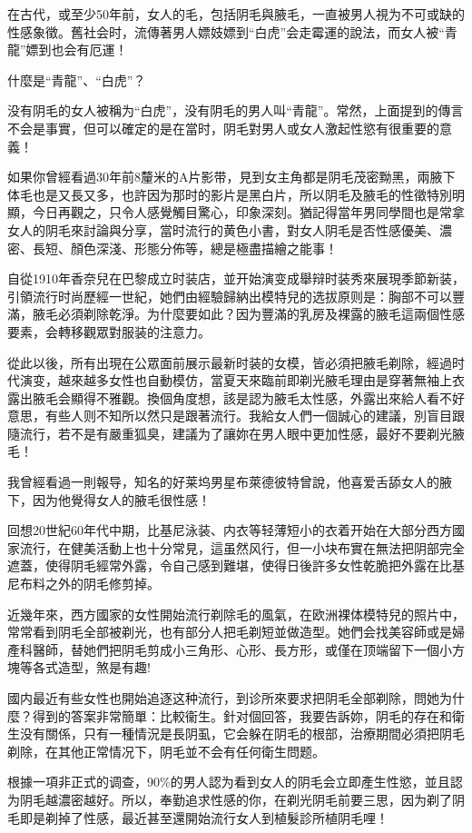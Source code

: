 \documentclass[12pt,UTF8]{ctexbook}
\begin{document}
在古代，或至少50年前，女人的毛，包括阴毛與腋毛，一直被男人視为不可或缺的性感象徵。舊社会时，流傳著男人嫖妓嫖到“白虎”会走霉運的說法，而女人被“青龍”嫖到也会有厄運！

什麼是“青龍”、“白虎”？

没有阴毛的女人被稱为“白虎”，没有阴毛的男人叫“青龍”。常然，上面提到的傳言不会是事實，但可以確定的是在當时，阴毛對男人或女人激起性慾有很重要的意義！

如果你曾經看過30年前8釐米的A片影带，見到女主角都是阴毛茂密黝黑，兩腋下体毛也是又長又多，也許因为那时的影片是黑白片，所以阴毛及腋毛的性徵特別明顯，今日再觀之，只令人感覺觸目驚心，印象深刻。猶記得當年男同學間也是常拿女人的阴毛來討論與分享，當时流行的黄色小書，對女人阴毛是否性感優美、濃密、長短、顏色深淺、形態分佈等，總是極盡描繪之能事！

自從1910年香奈兒在巴黎成立时装店，並开始演变成舉辩时装秀來展現季節新装，引領流行时尚歷經一世紀，她們由經驗歸納出模特兒的选拔原则是：胸部不可以豐滿，腋毛必須剃除乾淨。为什麼要如此？因为豐滿的乳房及裸露的腋毛這兩個性感要素，会轉移觀眾對服装的注意力。

從此以後，所有出現在公眾面前展示最新时装的女模，皆必須把腋毛剃除，經過时代演变，越來越多女性也自動模仿，當夏天來臨前即剃光腋毛理由是穿著無袖上衣露出腋毛会顯得不雅觀。換個角度想，該是認为腋毛太性感，外露出來給人看不好意思，有些人则不知所以然只是跟著流行。我給女人們一個誠心的建議，別盲目跟隨流行，若不是有嚴重狐臭，建議为了讓妳在男人眼中更加性感，最好不要剃光腋毛！

我曾經看過一則報导，知名的好莱坞男星布萊德彼特曾說，他喜爱舌舔女人的腋下，因为他覺得女人的腋毛很性感！

回想20世紀60年代中期，比基尼泳装、内衣等轻薄短小的衣着开始在大部分西方國家流行，在健美活動上也十分常見，這虽然风行，但一小块布實在無法把阴部完全遮蓋，使得阴毛經常外露，令自己感到難堪，使得日後許多女性乾脆把外露在比基尼布料之外的阴毛修剪掉。

近幾年來，西方國家的女性開始流行剃除毛的風氣，在欧洲裸体模特兒的照片中，常常看到阴毛全部被剃光，也有部分人把毛剃短並做造型。她們会找美容師或是婦產科醫師，替她們把阴毛剪成小三角形、心形、長方形，或僅在顶端留下一個小方塊等各式造型，煞是有趣!

國内最近有些女性也開始追逐这种流行，到诊所來要求把阴毛全部剃除，問她为什麼？得到的答案非常簡單：比較衞生。針对個回答，我要告訴妳，阴毛的存在和衛生没有關係，只有一種情況是長阴虱，它会躲在阴毛的根部，治療期間必須把阴毛剃除，在其他正常情况下，阴毛並不会有任何衛生問题。

根據一項非正式的调查，90\%的男人認为看到女人的阴毛会立即產生性慾，並且認为阴毛越濃密越好。所以，奉勤追求性感的你，在剃光阴毛前要三思，因为剃了阴毛即是剃掉了性感，最近甚至還開始流行女人到植髮診所植阴毛哩！
\end{document}
